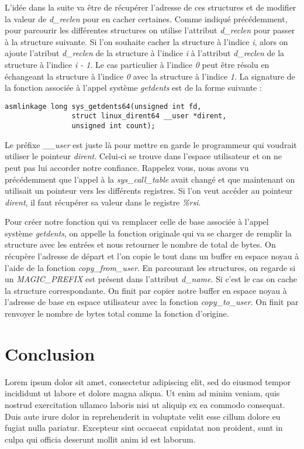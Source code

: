 \documentclass[journal, a4paper]{IEEEtran}
\begin{document}
L'idée dans la suite va être de récupérer l'adresse de ces structures et de modifier la valeur de \textit{d\_reclen} pour en cacher certaines. Comme indiqué précédemment, pour parcourir les différentes structures on utilise l'attribut \textit{d\_reclen} pour passer à la structure suivante. Si l'on souhaite cacher la structure à l'indice \textit{i}, alors on ajoute l'atribut \textit{d\_reclen} de la structure à l'indice \textit{i} à l'attribut \textit{d\_reclen} de la structure à l'indice \textit{i - 1}. Le cas particulier à l'indice \textit{0} peut être résolu en échangeant la structure à l'indice \textit{0} avec la structure à l'indice \textit{1}. La signature de la fonction associée à l'appel système \textit{getdents} est de la forme suivante : 
\begin{lstlisting}[style=CStyle]
asmlinkage long sys_getdents64(unsigned int fd,
				struct linux_dirent64 __user *dirent,
				unsigned int count);
\end{lstlisting}
Le préfixe \textit{\_\_user} est juste là pour mettre en garde le programmeur qui voudrait utiliser le pointeur \textit{dirent}. Celui-ci se trouve dans l'espace utilisateur et on ne peut pas lui accorder notre confiance. Rappelez vous, nous avons vu précédemment que l'appel à la \textit{sys\_call\_table} avait changé et que maintenant on utilisait un pointeur vers les différents registres. Si l'on veut accéder au pointeur \textit{dirent}, il faut récupérer sa valeur dans le registre \textit{\%rsi}.

Pour créer notre fonction qui va remplacer celle de base associée à l'appel système \textit{getdents}, on appelle la fonction originale qui va se charger de remplir la structure avec les entrées et nous retourner le nombre de total de bytes. On récupère l'adresse de départ et l'on copie le tout dans un buffer en espace noyau à l'aide de la fonction \textit{copy\_from\_user}. En parcourant les structures, on regarde si un \textit{MAGIC\_PREFIX} est présent dans l'attribut \textit{d\_name}. Si c'est le cas on cache la structure correspondante. On finit par copier notre buffer en espace noyau à l'adresse de base en espace utilisateur avec la fonction \textit{copy\_to\_user}. On finit par renvoyer le nombre de bytes total comme la fonction d'origine.

\section{Conclusion}

Lorem ipsum dolor sit amet, consectetur adipiscing elit, sed do eiusmod tempor incididunt ut labore et dolore magna aliqua. Ut enim ad minim veniam, quis nostrud exercitation ullamco laboris nisi ut aliquip ex ea commodo consequat. Duis aute irure dolor in reprehenderit in voluptate velit esse cillum dolore eu fugiat nulla pariatur. Excepteur sint occaecat cupidatat non proident, sunt in culpa qui officia deserunt mollit anim id est laborum.
\end{document}
